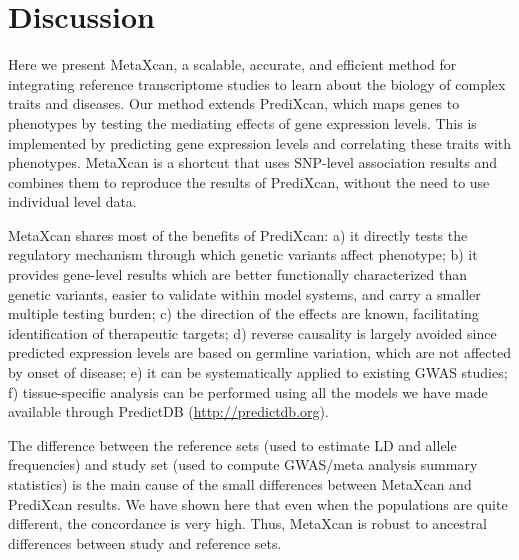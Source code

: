 \documentclass[10pt]{article}
\begin{document}

 

\section*{Discussion}

Here we present MetaXcan, a scalable, accurate, and efficient method for integrating reference transcriptome studies to learn about the biology of complex traits and diseases. Our method extends PrediXcan, which maps genes to phenotypes by testing the mediating effects of gene expression levels. This is implemented by predicting gene expression levels  and correlating these traits with phenotypes. MetaXcan is a shortcut that uses SNP-level association results and combines them to reproduce the results of PrediXcan, without the need to use individual level data.

MetaXcan shares most of the benefits of PrediXcan: a) it directly tests the regulatory mechanism through which genetic variants affect phenotype; b) it provides gene-level results which are better functionally characterized than genetic variants, easier to validate within model systems, and carry a smaller multiple testing burden; c) the direction of the effects are known, facilitating identification of therapeutic targets; d) reverse causality is largely avoided since predicted expression levels are based on germline variation, which are not affected by onset of disease; e) it can be systematically applied to existing GWAS studies; f) tissue-specific analysis can be performed using all the models we have made available through PredictDB (\url{http://predictdb.org}).

The difference between the reference sets (used to estimate LD and allele frequencies) and study set (used to compute GWAS/meta analysis summary statistics) is the main cause of the small differences between MetaXcan and PrediXcan results. We have shown here that even when the populations are quite different, the concordance is very high. Thus, MetaXcan is robust to ancestral differences between study and reference sets.
\end{document}
